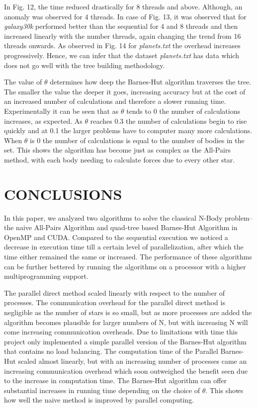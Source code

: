 In Fig. 12, the time reduced drastically for 8 threads and above. Although, an anomaly was observed for 4 threads. In case of Fig. 13, it was observed that for \textit{galaxy30k} performed better than the sequential for 4 and 8 threads and then increased linearly with the number threads, again changing the trend from 16 threads onwards. As observed in Fig. 14 for \textit{planets.txt} the overhead increases progressively. Hence, we can infer that the dataset \textit{planets.txt} has data which does not go well with the tree building methodology. \par

The value of $\theta$ determines how deep the Barnes-Hut algorithm traverses the tree. The smaller the value the deeper it goes, increasing accuracy but at the cost of an increased number of calculations and therefore a slower running time. Experimentally it can be seen that as $\theta$ tends to 0 the number of calculations increases, as expected. As $\theta$ reaches 0.3 the number of calculations begin to rise quickly and at 0.1 the larger problems have to computer many more calculations. When $\theta$ is 0 the number of calculations is equal to the number of bodies in the set. This shows the algorithm has become just as complex as the All-Pairs method, with each body needing to calculate forces due to every other star.

\section{CONCLUSIONS}

In this paper, we analyzed two algorithms to solve the classical N-Body problem{--} the naive All-Pairs Algorithm and quad-tree based Barnes-Hut Algorithm in OpenMP and CUDA. Compared to the sequential execution we noticed a decrease in execution time till a certain level of parallelization, after which the time either remained the same or increased. The performance of these algorithms can be further bettered by running the algorithms on a processor with a higher multiprogramming support. \par 

The parallel direct method scaled linearly with respect to the number of processes. The communication overhead for the parallel direct method is negligible as the number of stars is so small, but as more processes are added the algorithm becomes plausible for larger numbers of N, but with increasing N will come increasing communication overheads. Due to limitations with time this project only implemented a simple parallel version of the Barnes-Hut algorithm that contains no load balancing. The computation time of the Parallel Barnes-Hut scaled almost linearly, but with an increasing number of processes came an increasing communication overhead which soon outweighed the benefit seen due to the increase in computation time. The Barnes-Hut algorithm can offer substantial increases in running time depending on the choice of $\theta$. This shows how well the naive method is improved by parallel computing.


